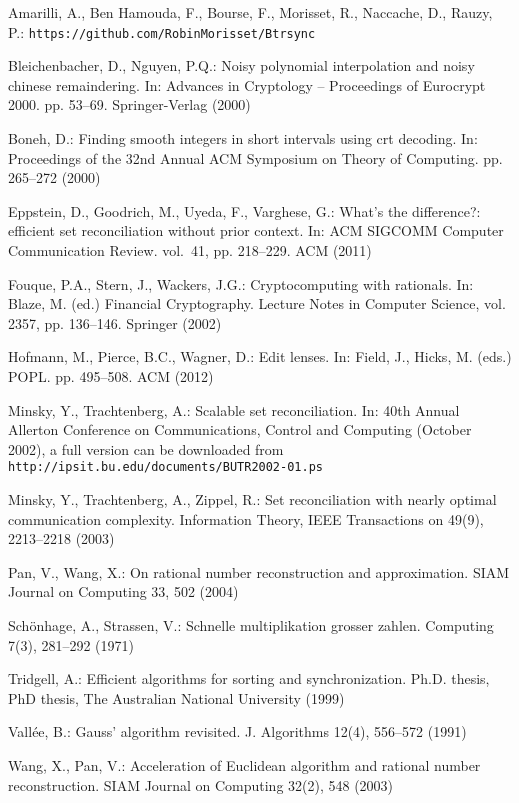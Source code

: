 \documentclass[11pt]{llncs}
\begin{document}
\begin{thebibliography}{10}
\providecommand{\url}[1]{\texttt{#1}}
\providecommand{\urlprefix}{URL }

Amarilli, A., {Ben Hamouda}, F., Bourse, F., Morisset, R., Naccache, D., Rauzy,
  P.: \url{https://github.com/RobinMorisset/Btrsync}

Bleichenbacher, D., Nguyen, P.Q.: Noisy polynomial interpolation and noisy
  chinese remaindering. In: Advances in Cryptology -- Proceedings of Eurocrypt
  2000. pp. 53--69. Springer-Verlag (2000)

Boneh, D.: Finding smooth integers in short intervals using crt decoding. In:
  Proceedings of the 32nd Annual ACM Symposium on Theory of Computing. pp.
  265--272 (2000)

Eppstein, D., Goodrich, M., Uyeda, F., Varghese, G.: What's the difference?:
  efficient set reconciliation without prior context. In: ACM SIGCOMM Computer
  Communication Review. vol.~41, pp. 218--229. ACM (2011)

Fouque, P.A., Stern, J., Wackers, J.G.: Cryptocomputing with rationals. In:
  Blaze, M. (ed.) Financial Cryptography. Lecture Notes in Computer Science,
  vol. 2357, pp. 136--146. Springer (2002)

Hofmann, M., Pierce, B.C., Wagner, D.: Edit lenses. In: Field, J., Hicks, M.
  (eds.) POPL. pp. 495--508. ACM (2012)

Minsky, Y., Trachtenberg, A.: Scalable set reconciliation. In: 40th Annual
  Allerton Conference on Communications, Control and Computing (October 2002),
  a full version can be downloaded from
  \url{http://ipsit.bu.edu/documents/BUTR2002-01.ps}

Minsky, Y., Trachtenberg, A., Zippel, R.: Set reconciliation with nearly
  optimal communication complexity. Information Theory, IEEE Transactions on
  49(9),  2213--2218 (2003)

Pan, V., Wang, X.: On rational number reconstruction and approximation. SIAM
  Journal on Computing  33,  502 (2004)

Sch{\"o}nhage, A., Strassen, V.: Schnelle multiplikation grosser zahlen.
  Computing  7(3),  281--292 (1971)

Tridgell, A.: Efficient algorithms for sorting and synchronization. Ph.D.
  thesis, PhD thesis, The Australian National University (1999)

Vall{\'e}e, B.: Gauss' algorithm revisited. J. Algorithms  12(4),  556--572
  (1991)

Wang, X., Pan, V.: Acceleration of {E}uclidean algorithm and rational number
  reconstruction. SIAM Journal on Computing  32(2),  548 (2003)

\end{thebibliography}

\end{document}
